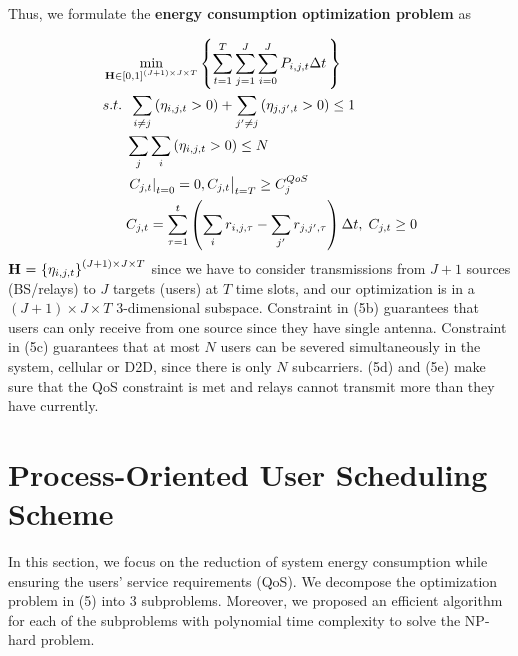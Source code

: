 \documentclass{ieeeaccess}
\begin{document}
Thus, we formulate the \textbf{energy consumption optimization problem} as

\begin{subequations}
\begin{align}
& \mathop {\min }\limits_{{\mathbf{{\rm H}}} \in {{\left[ {0,1} \right]}^{\left( {J + 1} \right) \times J \times T}}} \left\{ {\sum\limits_{t = 1}^T {\sum\limits_{j = 1}^J {\sum\limits_{i = 0}^J {{P_{i,j,t}}\Delta t} \,} } } \right\} \\
& {s.t.} \;\; \sum\limits_{i \ne j} {\left( {{\eta _{i,j,t}} > 0} \right)}  + \sum\limits_{j' \ne j} {\left( {{\eta _{j,j',t}} > 0} \right) \le {\text{1}}} \\
& \;\;\;\;\;\; \sum\limits_j {\sum\limits_i {\left( {{\eta _{i,j,t}} > 0} \right)} }  \le N \\
& \;\;\;\;\;\; {\left. {{{\left. {{C_{j,t}}} \right|}_{t = 0}} = 0, {C_{j,t}}} \right|_{t = T}} \ge C_j^{QoS} \\
& \;\;\;\;\;\; {C_{j,t}} = \sum\limits_{\tau  = 1}^t {\left( {\sum\limits_i {{r_{i,j,\tau }}}  - \sum\limits_{j'} {{r_{j,j',\tau }}} } \right)\Delta t} ,\; {C_{j,t}} \ge 0
\end{align}
\end{subequations}
${\mathbf{{\rm H}}}{\text{ = }}{\left\{ {{\eta _{i,j,t}}} \right\}^{\left( {J + 1} \right) \times J \times T}}$ since we have to consider transmissions from ${J + 1}$ sources (BS/relays) to $J$ targets (users) at $T$ time slots, and our optimization is in a $\left( {J + 1} \right) \times J \times T$ 3-dimensional subspace. Constraint in (5b) guarantees that users can only receive from one source since they have single antenna. Constraint in (5c) guarantees that at most $N$ users can be severed simultaneously in the system, cellular or D2D, since there is only $N$ subcarriers. (5d) and (5e) make sure that the QoS constraint is met and relays cannot transmit more than they have currently.


\section{Process-Oriented User Scheduling Scheme}
In this section, we focus on the reduction of system energy consumption while ensuring the users' service requirements (QoS). We decompose the optimization problem in (5) into 3 subproblems. Moreover, we proposed an efficient algorithm for each of the subproblems with polynomial time complexity to solve the NP-hard problem.

\end{document}
